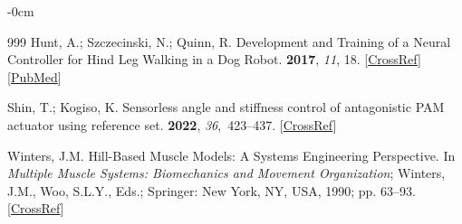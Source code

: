 \documentclass[actuators,article,accept,pdftex,moreauthors]{Definitions/mdpi}
\begin{document}
\begin{adjustwidth}{-\extralength}{0cm}
\begin{thebibliography}{999}
Hunt, A.; Szczecinski, N.; Quinn, R.
\newblock Development and {Training} of a {Neural} {Controller} for {Hind}
{Leg} {Walking} in a {Dog} {Robot}.
 {\bf 2017}, {\em 11}, 18. [\href{http://dx.doi.org/10.3389/fnbot.2017.00018}{CrossRef}] [\href{http://www.ncbi.nlm.nih.gov/pubmed/28420977}{PubMed}]

Shin, T.; Kogiso, K.
\newblock Sensorless angle and stiffness control of antagonistic {PAM} actuator
using reference set.
 {\bf 2022}, {\em 36},~423--437. [\href{http://dx.doi.org/10.1080/01691864.2022.2046502}{CrossRef}]

Winters, J.M.
\newblock Hill-{Based} {Muscle} {Models}: {A} {Systems} {Engineering}
{Perspective}. In {\em Multiple {Muscle} {Systems}: {Biomechanics} and
{Movement} {Organization}};  Winters, J.M., Woo, S.L.Y., Eds.;
Springer: New York, NY,  USA, 1990; pp. 63--93. [\href{http://dx.doi.org/10.1007/978-1-4613-9030-5_5}{CrossRef}]
\end{thebibliography}
\PublishersNote{}
\end{adjustwidth}
\end{document}
